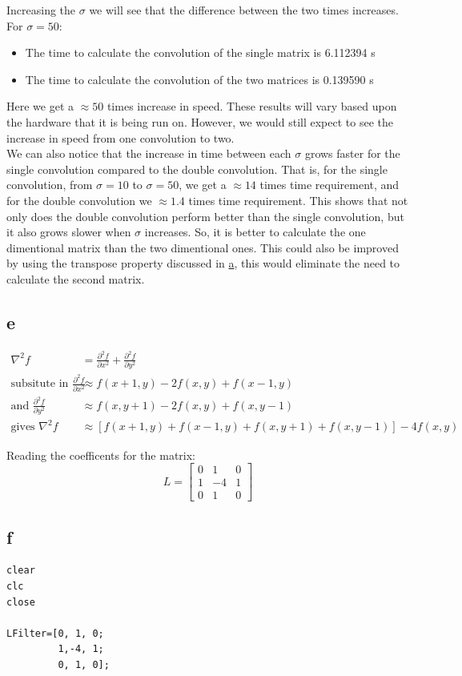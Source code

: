 \documentclass[11pt]{article}
\begin{document}
Increasing the \(\sigma\) we will see that the difference between the two times increases. For \(\sigma=50\):
\begin{itemize}
\item The time to calculate the convolution of the single matrix is 6.112394 s
\item The time to calculate the convolution of the two matrices is 0.139590 s
\end{itemize}
Here we get a \(\approx 50\) times increase in speed. These results will vary based upon the hardware that it is being run on. However, we would still expect to see the increase in speed from one convolution to two.\\
We can also notice that the increase in time between each \(\sigma\) grows faster for the single convolution compared to the double convolution. That is, for the single convolution, from \(\sigma=10\) to \(\sigma=50\), we get a \(\approx 14\) times time requirement, and for the double convolution we \(\approx 1.4\) times time requirement. This shows that not only does the double convolution perform better than the single convolution, but it also grows slower when \(\sigma\) increases. So, it is better to calculate the one dimentional matrix than the two dimentional ones. This could also be improved by using the transpose property discussed in \hyperref[sec:orgf48f845]{a}, this would eliminate the need to calculate the second matrix.
\subsection{e}
\label{sec:orgd16ab25}
\begin{align*}
\nabla^{2}f &= \frac{\partial^2 f}{\partial x^2}+ \frac{\partial^2 f}{\partial y^2} \\
\textrm{subsitute in } \frac{\partial^2 f}{\partial x^2} &\approx f(x+1,y)-2f(x,y)+f(x-1,y) \\
\textrm{and } \frac{\partial^2 f}{\partial y^2} &\approx f(x,y+1)-2f(x,y)+f(x,y-1) \\
\textrm{gives }\nabla^{2}f & \approx \left[ f(x+1,y) + f(x-1,y) + f(x,y+1) + f(x,y-1)\right] - 4f(x,y)
\end{align*}

Reading the coefficents for the matrix:
\[L=\begin{bmatrix}
0 & 1  & 0 \\
1 & -4 & 1 \\
0 & 1  & 0
\end{bmatrix}\]
\subsection{f}
\label{sec:org18e8365}
\begin{verbatim}
clear
clc
close

LFilter=[0, 1, 0;
         1,-4, 1;
         0, 1, 0];

\end{verbatim}
\end{document}
